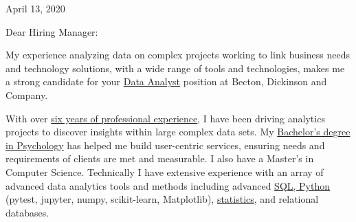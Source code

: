 \documentclass[letterpaper]{article}
\newcommand{\CVjobTitle}{Data Analyst}
\newcommand{\CVcompany}{Becton, Dickinson and Company}
\newcommand{\impt}[1]{\uline{#1}}
\begin{document}
\large

\null\hfill April 13, 2020
\vspace{1em}

Dear Hiring Manager:




My experience analyzing data on complex projects working to link business needs
and technology solutions, with a wide range of tools and technologies, makes me
a strong candidate for your \impt{\CVjobTitle} position at \CVcompany.

With over \impt{six years of professional experience}, I have been driving
analytics projects to discover insights within large complex data sets.  
My \impt{Bachelor's degree in Psychology} has helped me build user-centric services,
ensuring needs and requirements of clients are met and measurable.  
I also have a Master's in Computer Science.
Technically I have extensive experience with an array of advanced data analytics
tools and methods including advanced \impt{SQL, Python} (pytest, jupyter, numpy,
scikit-learn, Matplotlib), \impt{statistics}, and relational databases. 
\end{document}
